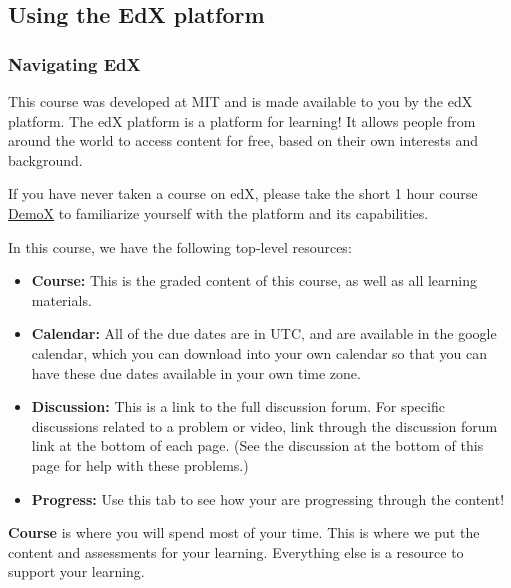 \documentclass[pdftex, brazil, 12pt, twoside]{article}
\begin{document}
\subsection{Using the EdX platform}
\label{gs-edx}

\subsubsection{Navigating EdX}
\label{gs-edx-nav}

This course was developed at MIT and is made available to you by the edX platform.
The edX platform is a platform for learning! It allows people from around the world
to access content for free, based on their own interests and background.

If you have never taken a course on edX, please take the short 1 hour course
\href{https://www.edx.org/course/demox-edx-demox-1-0}{DemoX} to familiarize yourself
with the platform and its capabilities.

In this course, we have the following top-level resources:

\begin{itemize}[noitemsep]
\item \textbf{Course:} This is the graded content of this course, as well as all
  learning materials.
\item \textbf{Calendar:} All of the due dates are in UTC, and are available in
  the google calendar, which you can download into your own calendar so that you
  can have these due dates available in your own time zone.
\item \textbf{Discussion:} This is a link to the full discussion forum. For
  specific discussions related to a problem or video, link through the discussion
  forum link at the bottom of each page. (See the discussion at the bottom of
  this page for help with these problems.)
\item \textbf{Progress:} Use this tab to see how your are progressing through
  the content!
\end{itemize}

\textbf{Course} is where you will spend most of your time. This is where we
put the content and assessments for your learning. Everything else is a resource
to support your learning.
\end{document}
